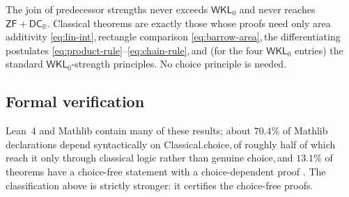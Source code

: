 \documentclass[11pt,reqno]{amsart}
\providecommand{\R}{\mathbb{R}}
\newcommand{\comma}{,\,\allowbreak}
\theoremstyle{redplain}
\begin{document}
The join of predecessor strengths never exceeds $\textsf{WKL}_0$ and never reaches $\textsf{ZF}+\textsf{DC}_\R$. Classical theorems are exactly those whose proofs need only area additivity \autoref{eq:lin-int}\comma rectangle comparison \autoref{eq:barrow-area}\comma the differentiating postulates \autoref{eq:product-rule}--\autoref{eq:chain-rule}\comma and (for the four $\textsf{WKL}_0$ entries) the standard $\textsf{WKL}_0$-strength principles. No choice principle is needed.
\endgroup

\subsection{Formal verification}
Lean~4 and Mathlib \cite{Lean4} contain many of these results; about $70.4\%$ of Mathlib declarations depend syntactically on \textsf{Classical.choice}\comma of roughly half of which reach it only through classical logic rather than genuine choice\comma and $13.1\%$ of theorems have a choice-free statement with a choice-dependent proof \cite{Crossref2026}. The classification above is strictly stronger: it certifies the choice-free proofs.
\end{document}

